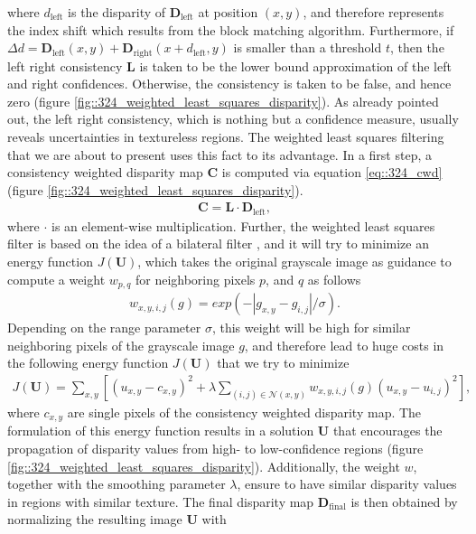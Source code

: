 where $d_\text{left}$ is the disparity of $\bm{D}_\text{left}$ at position $(x,y)$, and therefore represents the index shift which results from the block matching algorithm. Furthermore, if $\Delta d = \bm{D}_\text{left}(x, y) + \bm{D}_\text{right}(x + d_\text{left}, y)$ is smaller than a threshold $t$, then the left right consistency $\bm{L}$ is taken to be the lower bound approximation of the left and right confidences. Otherwise, the consistency is taken to be false, and hence zero (figure \ref{fig::324_weighted_least_squares_disparity}). As already pointed out, the left right consistency, which is nothing but a confidence measure, usually reveals uncertainties in textureless regions. The weighted least squares filtering that we are about to present uses this fact to its advantage. In a first step, a consistency weighted disparity map $\bm{C}$ is computed via equation \ref{eq::324_cwd} (figure \ref{fig::324_weighted_least_squares_disparity}).
\begin{align}
	\bm{C}=\bm{L}\cdot\bm{D}_\text{left},
	\label{eq::324_cwd}
\end{align}
where $\cdot$ is an element-wise multiplication. Further, the weighted least squares filter is based on the idea of a bilateral filter \cite{tomasi1998bilateral}, and it will try to minimize an energy function $J(\bm{U})$, which takes the original grayscale image as guidance to compute a weight $w_{p,q}$ for neighboring pixels $p$, and $q$ as follows
\begin{align}
	w_{x,y,i,j}(g) = exp(-|g_{x,y}-g_{i,j}|/\sigma).
	\label{eq::324_weight}
\end{align}
Depending on the range parameter $\sigma$, this weight will be high for similar neighboring pixels of the grayscale image $g$, and therefore lead to huge costs in the following energy function $J(\bm{U})$ that we try to minimize
\begin{align}
	J(\bm{U}) = \sum_{x,y}\left[(u_{x,y}-c_{x,y})^2+\lambda\sum_{(i,j)\in\mathcal{N}(x,y)}w_{x,y,i,j}(g)(u_{x,y}-u_{i,j})^2\right],
\end{align}
where $c_{x,y}$ are single pixels of the consistency weighted disparity map. The formulation of this energy function results in a solution $\bm{U}$ that encourages the propagation of disparity values from high- to low-confidence regions (figure \ref{fig::324_weighted_least_squares_disparity}). Additionally, the weight $w$, together with the smoothing parameter $\lambda$, ensure to have similar disparity values in regions with similar texture. The final disparity map $\bm{D}_\text{final}$ is then obtained by normalizing the resulting image $\bm{U}$ with
